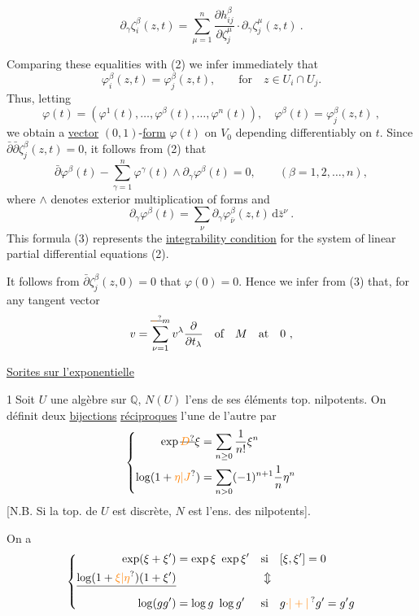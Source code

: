 \[
\partial_\gamma\zeta_i^\beta(z,t)=\sum_{\mu=1}^n
\frac{\partial h_{ij}^\beta}{\partial\zeta_j^\mu}\cdot\partial_\gamma\zeta_j^\mu(z,t)\ .
\]

Comparing these equalities with (2) we infer immediately that
\[
\varphi_i^\beta(z,t)=\varphi_j^\beta(z,t),\qquad\text{for}\quad z\in U_i\cap U_j.
\]
Thus, letting
\[
\varphi(t)=(\varphi^1(t),\ldots,\varphi^\beta(t),\ldots,\varphi^n(t)),\quad
\varphi^\beta(t)=\varphi_j^\beta(z,t)\ ,
\]
we obtain a \uline{vector} $(0,1)$-\uline{form} $\varphi(t)$ on $V_0$ depending
differentiably on $t$. Since $\bar\partial\bar\partial\zeta_j^\beta(z,t)=0$, it follows from
(2) that
\[
\bar\partial\varphi^\beta(t)-\sum_{\gamma=1}^n\varphi^\gamma(t)\wedge\partial_\gamma\varphi^\beta(t)=0,\qquad
(\beta=1,2,\ldots,n),\tag*{(3)}
\]
where $\wedge$ denotes exterior multiplication of forms and
\[
\partial_\gamma\varphi^\beta(t)=\sum_\nu\partial_\gamma\varphi_{\bar\nu}^\beta(z,t)\,\mathrm d\bar z^\nu\ .
\]
This formula (3) represents the \uline{integrability condition} for the
system of linear partial differential equations (2).

It follows from $\bar\partial\zeta_j^\beta(z,0)=0$ that $\varphi(0)=0$. Hence we
infer from (3) that, for any tangent vector
\[
v=\sum_{\nu=1}^{\deleted{\unsure{-}}m}v^\lambda\frac{\partial}{\partial t_\lambda}\quad\text{of}\quad M\quad\text{at}\quad0\ ,
\]


\uline{Sorites sur l'exponentielle}

\textcircled{1}\quad Soit $U$ une algèbre  sur $\mathbb Q$, $N(U)$ l'ens de ses éléments top.
nilpotents. On définit deux \uline{bijections} \uline{réciproques}
l'une de l'autre
par
\[
\left\{\begin{aligned}
\exp\deleted{\unsure{D}}\xi&=\sum_{n\geq0}\frac1{n!}\xi^n\\
\log(1+\unsure{\eta|J})&=\sum_{n>0}(-1)^{n+1}\frac1n\eta^n
\end{aligned}\right.
\]
[N.B. Si la top. de $U$ est discrète, $N$ est l'ens. des  nilpotents].

On a
\[
\left\{\begin{aligned}
\exp(\xi+\xi')&=\exp\xi\ \exp\xi'&&\text{si}\quad [\xi,\xi']=0\\
\deleted{\log(1+\unsure{\xi|\eta})(1+\xi')}& &&\Updownarrow\\
\log(gg')&=\log g\ \log g'&&\text{si}\quad g\unsure{\cdot|+|\,}g'=g'g
\end{aligned}\right.
\]

